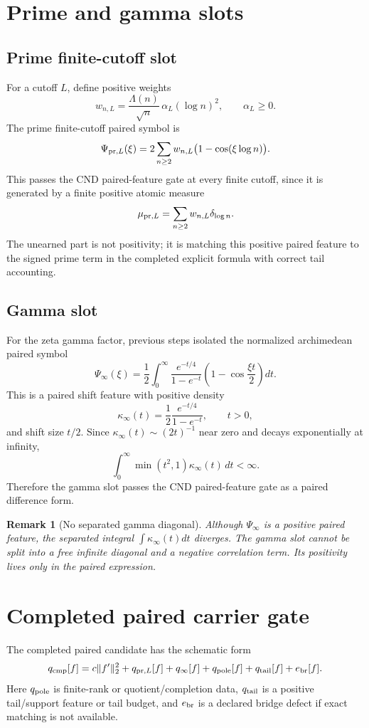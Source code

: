 \documentclass[11pt]{article}
\newtheorem{remark}{Remark}
\begin{document}
\section{Prime and gamma slots}
\subsection{Prime finite-cutoff slot}
For a cutoff \(L\), define positive weights
\[
  w_{n,L}=\frac{\Lambda(n)}{\sqrt n}\,\alpha_L(\log n)^2,
  \qquad \alpha_L\ge0.
\]
The prime finite-cutoff paired symbol is
\[
  \Psi_{{\rm pr},L}(\xi)
  =2\sum_{n\ge2}w_{n,L}\bigl(1-\cos(\xi\log n)\bigr).
\]
This passes the CND paired-feature gate at every finite cutoff, since it is generated by a finite positive atomic measure
\[
  \mu_{{\rm pr},L}=\sum_{n\ge2}w_{n,L}\delta_{\log n}.
\]
The unearned part is not positivity; it is matching this positive paired feature to the signed prime term in the completed explicit formula with correct tail accounting.

\subsection{Gamma slot}
For the zeta gamma factor, previous steps isolated the normalized archimedean paired symbol
\[
  \Psi_\infty(\xi)=\frac12\int_0^\infty
  \frac{e^{-t/4}}{1-e^{-t}}\left(1-\cos\frac{\xi t}{2}\right)dt.
\]
This is a paired shift feature with positive density
\[
  \kappa_\infty(t)=\frac12\frac{e^{-t/4}}{1-e^{-t}},\qquad t>0,
\]
and shift size \(t/2\).  Since \(\kappa_\infty(t)\sim (2t)^{-1}\) near zero and decays exponentially at infinity,
\[
  \int_0^\infty \min(t^2,1)\kappa_\infty(t)\,dt<\infty.
\]
Therefore the gamma slot passes the CND paired-feature gate as a paired difference form.

\begin{remark}[No separated gamma diagonal]
Although \(\Psi_\infty\) is a positive paired feature, the separated integral \(\int\kappa_\infty(t)dt\) diverges.  The gamma slot cannot be split into a free infinite diagonal and a negative correlation term.  Its positivity lives only in the paired expression.
\end{remark}

\section{Completed paired carrier gate}
The completed paired candidate has the schematic form
\[
  q_{\rm cmp}[f]
  =c\|f'\|_2^2+q_{{\rm pr},L}[f]+q_\infty[f]+q_{\rm pole}[f]+q_{\rm tail}[f]+e_{\rm br}[f].
\]
Here \(q_{\rm pole}\) is finite-rank or quotient/completion data, \(q_{\rm tail}\) is a positive tail/support feature or tail budget, and \(e_{\rm br}\) is a declared bridge defect if exact matching is not available.
\end{document}

